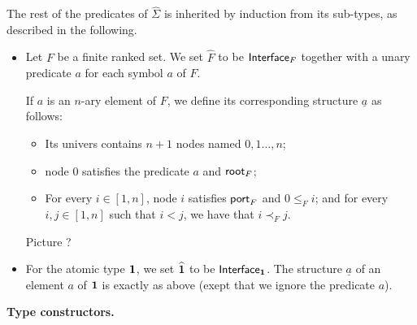 The rest of the predicates of $\widehat \Sigma$ is inherited by induction from its sub-types, as described in the following.\\

   \begin{itemize}
   \item Let $F$ be a finite ranked set.  We set $\widehat F$ to be $\mathsf{Interface}_{F}$ together with a unary predicate $a$ for each symbol $a$ of $F$. 
            
            If $a$ is an $n$-ary element of $F$, we define its corresponding structure $\underline a$ as follows:
            \begin{itemize}
            \item Its univers contains $n+1$ nodes named $0,1\dots,n$;
            \item node $0$ satisfies the predicate $a$ and $\mathsf{root}_{F}$;
            \item For every $i\in[1,n]$, node $i$ satisfies $\mathsf{port}_{F}$  and $0\leq_F i$; and for every $i, j \in[1,n]$ such that $i< j$, we have that $i\prec_F j$.
\end{itemize}             
            \begin{center}
            Picture ?
            \end{center}
            \item For the atomic type $\mathbf{1}$, we set $\widehat {\mathbf{1}}$ to be $\mathsf{Interface}_{\mathbf{1}}$. The structure $\underline a$ of an element $a$ of $\mathbf{1}$ is exactly as above (exept that we ignore the predicate $a$).
        \end{itemize}
    {\bf Type constructors.}
    
